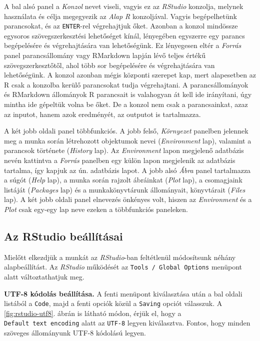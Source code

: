 \documentclass[
]{book}
\begin{document}
A bal alsó panel a \emph{Konzol} nevet viseli, vagyis ez az \emph{RStudio} konzolja, melynek használata és célja megegyezik az \emph{Alap R} konzoljával. Vagyis begépelhetünk parancsokat, és az \texttt{ENTER}-rel végrehajtjuk őket. Azonban a konzol mindössze egysoros szövegszerkesztési lehetőséget kínál, lényegében egyszerre egy parancs begépelésére és végrehajtására van lehetőségünk. Ez lényegesen eltér a \emph{Forrás} panel parancsállomány vagy RMarkdown lapján lévő teljes értékű szövegszerkesztőtől, ahol több sor begépelésére és végrehajtására van lehetőségünk. A konzol azonban mégis központi szerepet kap, mert alapesetben az R csak a konzolba kerülő parancsokat tudja végrehajtani. A parancsállományok és RMarkdown állományok R parancsait is valahogyan át kell ide irányítani, úgy mintha ide gépeltük volna be őket. De a konzol nem csak a parancsainkat, azaz az inputot, hanem azok eredményét, az outputot is tartalmazza.

A két jobb oldali panel többfunkciós. A jobb felső, \emph{Környezet} panelben jelennek meg a munka során létrehozott objektumok nevei (\emph{Environment} lap), valamint a parancsok története (\emph{History} lap). Az \emph{Environment} lapon megjelenő adatbázis nevén kattintva a \emph{Forrás} panelben egy külön lapon megjelenik az adatbázis tartalma, így kapjuk az ún. adatbázis lapot. A jobb alsó \emph{Ábra} panel tartalmazza a súgót (\emph{Help} lap), a munka során rajzolt ábráinkat (\emph{Plot} lap), a csomagjaink listáját (\emph{Packages} lap) és a munkakönyvtárunk állományait, könyvtárait (\emph{Files} lap). A két jobb oldali panel elnevezés önkényes volt, hiszen az \emph{Environment} és a \emph{Plot} csak egy-egy lap neve ezeken a többfunkciós paneleken.

\hypertarget{az-rstudio-beuxe1lluxedtuxe1sai}{%
\subsection{Az RStudio beállításai}\label{az-rstudio-beuxe1lluxedtuxe1sai}}

Mielőtt elkezdjük a munkát az \emph{RStudio}-ban feltétlenül módosítsunk néhány alapbeállítást. Az \emph{RStudio} működését az \texttt{Tools\ /\ Global\ Options} menüpont alatt változtathatjuk meg.

\textbf{UTF-8 kódolás beállítása.} A fenti menüpont kiválasztása után a bal oldali listából a \texttt{Code}, majd a fenti opciók közül a \texttt{Saving} opciót válasszuk. A \ref{fig:rstudio-utf8}. ábrán is látható módon, érjük el, hogy a \texttt{Default\ text\ encoding} alatt az \texttt{UTF-8} legyen kiválasztva. Fontos, hogy minden szöveges állományunk UTF-8 kódolású legyen.
\end{document}
